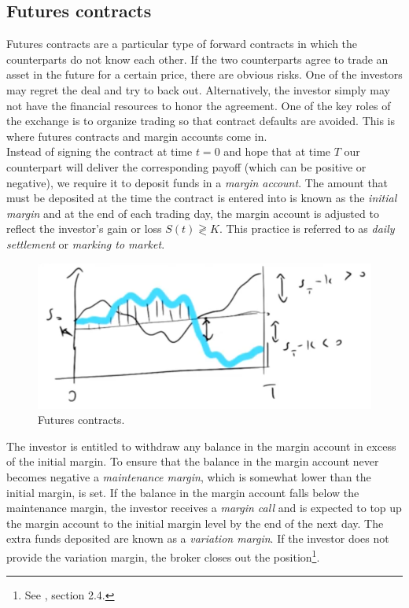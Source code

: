 \subsection{Futures contracts}
Futures contracts are a particular type of forward contracts in which the counterparts do not know each other. If the two counterparts agree to trade an asset in the future for a certain price, there are obvious risks. One of the investors may regret the deal and try to back out. Alternatively, the investor simply may not have the financial resources to honor the agreement. One of the key roles of the exchange is to organize trading so that contract defaults are avoided. This is where futures contracts and margin accounts come in.\\
Instead of signing the contract at time $t=0$ and hope that at time $T$ our counterpart will deliver the corresponding payoff (which can be positive or negative), we require it to deposit funds in a \emph{margin account}. The amount that must be deposited at the time the contract is entered into is known as the \emph{initial margin} and at the end of each trading day, the margin account is adjusted to reflect the investor's gain or loss $S(t)\gtrless K$. This practice is referred to as \emph{daily settlement} or \emph{marking to market}.
\begin{figure}[ht]
    \centering
    \includegraphics[scale=0.27]{fig/tmp/fig31.png}
    \caption{Futures contracts.}
    \label{fig:futures}
\end{figure}
\newline The investor is entitled to withdraw any balance in the margin account in excess of the initial margin. To ensure that the balance in the margin account never becomes negative a \emph{maintenance margin}, which is somewhat lower than the initial margin, is set. If the balance in the margin account falls below the maintenance margin, the investor receives a \emph{margin call} and is expected to top up the margin account to the initial margin level by the end of the next day. The extra funds deposited are known as a \emph{variation margin}. If the investor does not provide the variation margin, the broker closes out the position\footnote{See \cite{hull}, section 2.4.}.\\
